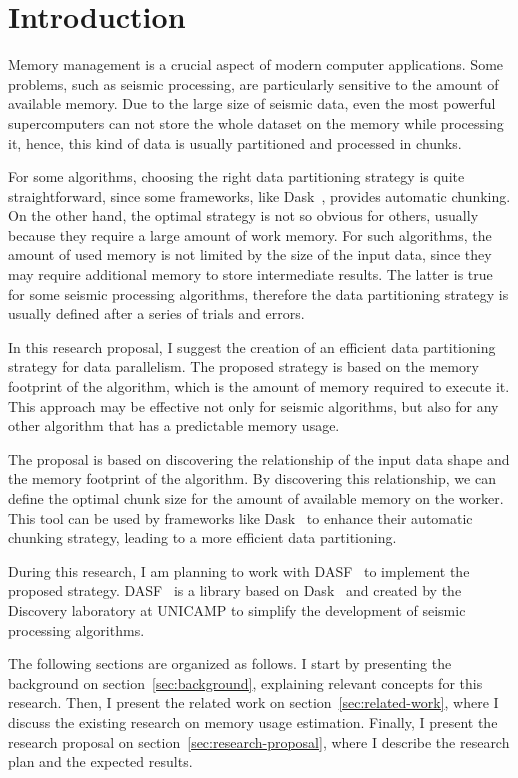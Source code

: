 \section{Introduction}
\label{sec:introduction}

Memory management is a crucial aspect of modern computer applications.
Some problems, such as seismic processing, are particularly sensitive to the amount of available memory.
Due to the large size of seismic data, even the most powerful supercomputers can not store the whole dataset on the memory while processing it, hence, this kind of data is usually partitioned and processed in chunks.

For some algorithms, choosing the right data partitioning strategy is quite straightforward, since some frameworks, like Dask~\cite{dask}, provides automatic chunking.
On the other hand, the optimal strategy is not so obvious for others, usually because they require a large amount of work memory.
For such algorithms, the amount of used memory is not limited by the size of the input data, since they may require additional memory to store intermediate results.
The latter is true for some seismic processing algorithms, therefore the data partitioning strategy is usually defined after a series of trials and errors.

In this research proposal, I suggest the creation of an efficient data partitioning strategy for data parallelism.
The proposed strategy is based on the memory footprint of the algorithm, which is the amount of memory required to execute it.
This approach may be effective not only for seismic algorithms, but also for any other algorithm that has a predictable memory usage.

The proposal is based on discovering the relationship of the input data shape and the memory footprint of the algorithm.
By discovering this relationship, we can define the optimal chunk size for the amount of available memory on the worker.
This tool can be used by frameworks like Dask~\cite{dask} to enhance their automatic chunking strategy, leading to a more efficient data partitioning.

During this research, I am planning to work with \ac{DASF}~\cite{dasf} to implement the proposed strategy.
\ac{DASF}~\cite{dasf} is a library based on Dask~\cite{dask} and created by the Discovery laboratory at \ac{UNICAMP} to simplify the development of seismic processing algorithms.

The following sections are organized as follows.
I start by presenting the background on section~\ref{sec:background}, explaining relevant concepts for this research.
Then, I present the related work on section~\ref{sec:related-work}, where I discuss the existing research on memory usage estimation.
Finally, I present the research proposal on section~\ref{sec:research-proposal}, where I describe the research plan and the expected results.
